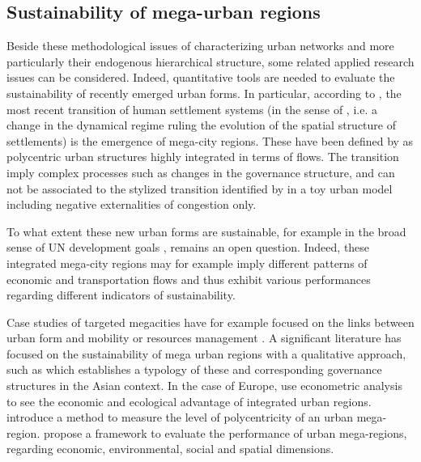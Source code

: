 \documentclass{jimis-en}
\begin{document}
\subsection{Sustainability of mega-urban regions}


Beside these methodological issues of characterizing urban networks and more particularly their endogenous hierarchical structure, some related applied research issues can be considered. Indeed, quantitative tools are needed to evaluate the sustainability of recently emerged urban forms. In particular, according to \cite{lenechet2017peupler}, the most recent transition of human settlement systems (in the sense of \cite{sanders2017peupler}, i.e. a change in the dynamical regime ruling the evolution of the spatial structure of settlements) is the emergence of mega-city regions. These have been defined by \cite{hall2006polycentric} as polycentric urban structures highly integrated in terms of flows. The transition imply complex processes such as changes in the governance structure, and can not be associated to the stylized transition identified by \cite{louf2013modeling} in a toy urban model including negative externalities of congestion only.

To what extent these new urban forms are sustainable, for example in the broad sense of UN development goals \citep{komiyama2006sustainability}, remains an open question. Indeed, these integrated mega-city regions may for example imply different patterns of economic and transportation flows and thus exhibit various performances regarding different indicators of sustainability.

Case studies of targeted megacities have for example focused on the links between urban form and mobility or resources management \citep{sorensen2010megacities}. A significant literature has focused on the sustainability of mega urban regions with a qualitative approach, such as \cite{laquian2011planning} which establishes a typology of these and corresponding governance structures in the Asian context. In the case of Europe, \cite{marull2013emerging} use econometric analysis to see the economic and ecological advantage of integrated urban regions. \cite{feng2018spatiotemporal} introduce a method to measure the level of polycentricity of an urban mega-region. \cite{su2017china} propose a framework to evaluate the performance of urban mega-regions, regarding economic, environmental, social and spatial dimensions.
\end{document}

